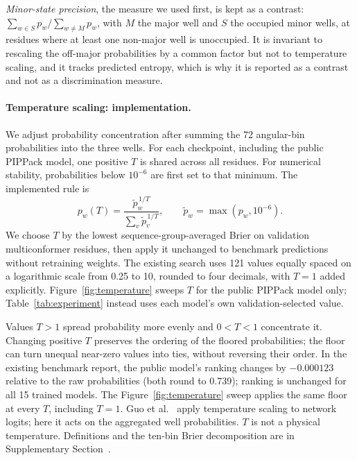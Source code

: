 \documentclass[10pt,twocolumn,a4paper]{article}
\begin{document}
\emph{Minor-state precision}, the measure we used first, is kept as a contrast:
$\sum_{w \in S} p_w / \sum_{w \neq M} p_w$, with $M$ the major well and $S$ the occupied
minor wells, at residues where at least one non-major well is unoccupied. It is invariant
to rescaling the off-major probabilities by a common factor but not to temperature
scaling, and it tracks predicted entropy, which is why it is reported as a contrast and
not as a discrimination measure.

\paragraph{Temperature scaling: implementation.} We adjust probability concentration after summing the 72 angular-bin probabilities into the three wells. For each checkpoint, including the public PIPPack model, one positive $T$ is shared across all residues. For numerical stability, probabilities below $10^{-6}$ are first set to that minimum. The implemented rule is
\[
 p_w(T)=\frac{\tilde p_w^{\,1/T}}{\sum_v\tilde p_v^{\,1/T}},
 \qquad \tilde p_w=\max(p_w,10^{-6}).
\]
We choose $T$ by the lowest sequence-group-averaged Brier on validation multiconformer residues, then apply it unchanged to benchmark predictions without retraining weights. The existing search uses 121 values equally spaced on a logarithmic scale from 0.25 to 10, rounded to four decimals, with $T=1$ added explicitly. Figure~\ref{fig:temperature} sweeps $T$ for the public PIPPack model only; Table~\ref{tab:experiment} instead uses each model's own validation-selected value.

Values $T>1$ spread probability more evenly and $0<T<1$ concentrate it. Changing positive $T$ preserves the ordering of the floored probabilities; the floor can turn unequal near-zero values into ties, without reversing their order. In the existing benchmark report, the public model's ranking changes by $-0.000123$ relative to the raw probabilities (both round to 0.739); ranking is unchanged for all 15 trained models. The Figure~\ref{fig:temperature} sweep applies the same floor at every $T$, including $T=1$. Guo et al.~\citep{guo2017calibration} apply temperature scaling to network logits; here it acts on the aggregated well probabilities. $T$ is not a physical temperature. Definitions and the ten-bin Brier decomposition are in Supplementary Section~.
\end{document}
